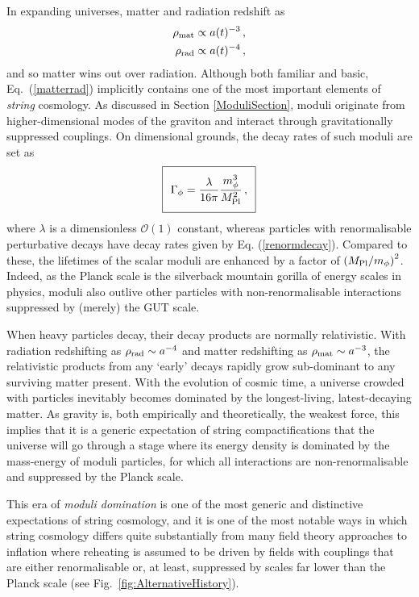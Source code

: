 In expanding universes, matter and radiation redshift as
\begin{subequations}
 \begin{align}\label{matterrad}
    \rho_{\rm mat} & \propto  a(t)^{-3}\,, \\
     \rho_{\rm rad} & \propto  a(t)^{-4}\,,
 \end{align}
\end{subequations}
%
and so matter wins out over radiation.
Although both familiar and basic, Eq.~(\ref{matterrad}) implicitly contains one of the most important elements of \emph{string} cosmology. As discussed in Section \ref{ModuliSection}, moduli originate from higher-dimensional modes of the graviton and interact through gravitationally suppressed couplings. On dimensional grounds, the decay rates of such moduli are set as
\begin{equation}
\setlength\fboxsep{0.25cm}
\setlength\fboxrule{0.4pt}
\boxed{
\Gamma_\phi = \frac{\lambda}{16 \pi} \frac{m_\phi^3}{M_{\rm Pl}^2}\,,
}
\end{equation}
where $\lambda$ is a dimensionless $\mathcal{O}(1)$ constant, whereas particles with renormalisable perturbative decays have decay rates given by Eq. (\ref{renormdecay}). Compared to these, the lifetimes of the scalar moduli are enhanced by a factor of $\left(M_{\rm Pl}/m_\phi\right)^2$. Indeed, as the Planck scale is the silverback mountain gorilla of energy scales in physics, moduli also outlive other particles with non-renormalisable interactions suppressed by (merely) the GUT scale.

When heavy particles decay, their decay products are normally relativistic. With radiation redshifting as $\rho_{\rm rad} \sim a^{-4}$ and matter
redshifting as $\rho_{\rm mat} \sim a^{-3}$, the relativistic products from any `early' decays rapidly grow sub-dominant to any surviving 
matter present.
With the evolution of cosmic time, a universe crowded with particles inevitably becomes dominated by the longest-living, latest-decaying matter. As gravity is, both empirically and theoretically, the weakest force, this implies that it is a generic expectation of string compactifications that the universe will go through a stage where its energy density is dominated by the mass-energy of moduli particles, for which all interactions are non-renormalisable and suppressed by the Planck scale. 

This era of \emph{moduli domination} is one of the most generic and distinctive expectations of string cosmology, and it is one of the most notable ways in which string cosmology differs quite substantially from many field theory approaches to inflation where reheating is assumed to be driven by fields with couplings that are either renormalisable or, at least, suppressed by scales far lower than the Planck scale (see Fig.~\ref{fig:AlternativeHistory}). 

